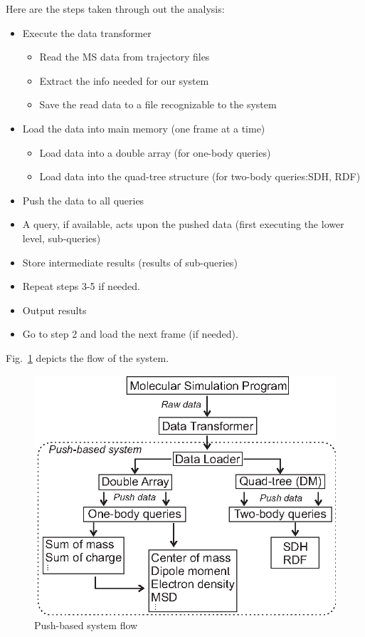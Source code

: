 \documentclass[10pt,journal,final,letterpaper,twocolumn]{IEEEtran}
\begin{document}
Here are the steps taken through out the analysis:
\begin{itemize}
\item[(1)] Execute the data transformer
\begin{itemize}
\item[(a)] Read the MS data from trajectory files
\item[(b)] Extract the info needed for our system
\item[(c)] Save the read data to a file recognizable to the system
\end{itemize}
\item[(2)] Load the data into main memory (one frame at a time)
\begin{itemize}
\item[(a)] Load data into a double array (for one-body queries)
\item[(b)] Load data into the quad-tree structure (for two-body queries:SDH, RDF)
\end{itemize}
\item[(3)] Push the data to all queries
\item[(4)] A query, if available, acts upon the pushed data (first executing
the lower level, sub-queries)
\item[(5)] Store intermediate results (results
of sub-queries)
\item[(6)] Repeat steps 3-5 if needed.
\item[(7)] Output results
\item[(8)] Go to step 2 and load the next frame (if needed).
\end{itemize}

Fig.~\ref{fg:system} depicts the flow of the system.

\begin{figure}
 \centerline{ \includegraphics[width=.8\columnwidth]{images/system.eps} }
 \caption{Push-based system flow}
 \label{fg:system}
\end{figure}
\end{document}
